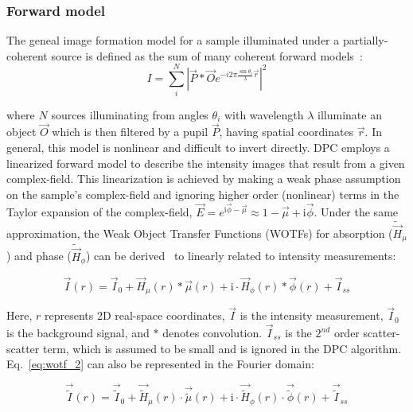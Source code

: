 \subsubsection{Forward model}
\label{sec:forward}
The geneal image formation model for a sample illuminated under a partially-coherent source is defined as the sum of many coherent forward models~\cite{mehta2009quantitative}:
\begin{equation}
I = \sum_i^N |\vec{P} * \vec{O}e^{-i2\pi \frac{\sin{\theta}_i}{\lambda} \vec{r}}|^2
\end{equation}

\noindent where $N$ sources illuminating from angles $\theta_i$ with wavelength $\lambda$ illuminate an object $\vec{O}$ which is then
 filtered by a pupil $\vec{P}$, having spatial coordinates $\vec{r}$. In general, this model is nonlinear and difficult to invert directly. DPC employs a linearized forward model to describe the intensity images that result from a given complex-field. This linearization is achieved by making a weak phase assumption on the sample's complex-field and ignoring higher order (nonlinear) terms in the Taylor expansion of the complex-field, $\vec{E} = e^{\mathrm{i}\vec{\phi} -\vec{\mu}} \approx 1 - \vec{\mu} + \mathrm{i}\vec{\phi}$.
Under the same approximation, the Weak Object Transfer Functions (WOTFs) for absorption ($\tilde{\vec{H}}_{\mu}$) and phase ($\tilde{\vec{H}}_{\phi}$) can be derived~\cite{Claus2015, tian2015quantitative, Hamilton1984a} to linearly related to intensity measurements:

\begin{equation}
	\vec{I}(r) = \vec{I}_{0} +\vec{H}_{\mu}(r) * \vec{\mu}(r) + \mathrm{i}\cdot \vec{H}_{\phi}(r) * \vec{\phi}(r) + \vec{I}_{ss}
	\label{eq:wotf_2}
\end{equation}

\noindent Here, $r$ represents 2D real-space coordinates, $\vec{I}$ is the intensity measurement, $\vec{I}_0$ is the background signal, and $*$ denotes convolution. $\vec{I}_{ss}$ is the $2^{nd}$ order scatter-scatter term, which is assumed to be small and is ignored in the DPC algorithm. Eq.~\ref{eq:wotf_2} can also be represented in the Fourier domain:

\begin{equation}
	\vec{\tilde{I}}(r) = \vec{\tilde{I}}_{0} + \vec{\tilde{H}}_{\mu}(r) \cdot \vec{\tilde{\mu}}(r) + \mathrm{i}\cdot \vec{\tilde{H}}_{\phi}(r) \cdot \vec{\tilde{\phi}}(r) + \vec{\tilde{I}}_{ss}
	\label{eq:wotf_2_f}
\end{equation}

